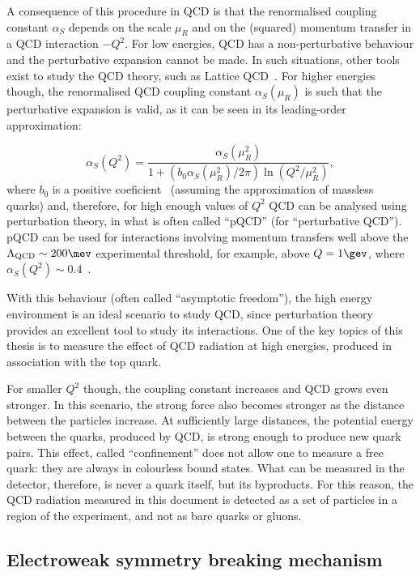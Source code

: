 A consequence of this procedure in QCD is that the
renormalised coupling constant $\alpha_S$ depends on the scale $\mu_R$ and on the (squared) momentum transfer
in a QCD interaction $- Q^2$. For low energies, QCD has a non-perturbative behaviour
and the perturbative expansion cannot be made. In such situations, other tools exist to study the QCD theory, such as Lattice QCD~\cite{latticeqcd}.
For higher energies though, the renormalised QCD coupling constant $\alpha_S(\mu_R)$ is such that the perturbative expansion is valid, as it can be
seen in its leading-order approximation:

\begin{equation}
\alpha_S(Q^2) = \frac{\alpha_S(\mu_R^2)}{1 + (b_0 \alpha_S(\mu_R^2)/2\pi) \ln(Q^2/\mu_R^2)},
\label{eq:alphas}
\end{equation}
where $b_0$ is a positive coeficient~\cite{qft} (assuming the approximation of massless quarks) and, therefore, for high enough values of $Q^2$ QCD can be
analysed using perturbation theory, in what is often called ``pQCD'' (for ``perturbative QCD''). pQCD can be used for interactions involving momentum transfers well
above the $\Lambda_{\textrm{QCD}} \sim 200\mev$ experimental threshold, for example, above $Q = 1\gev$, where $\alpha_S(Q^2) \sim 0.4$~\cite{qft}.

With this behaviour (often called ``asymptotic freedom''), the high energy environment is an ideal scenario to study QCD, since perturbation theory
provides an excellent tool to study its interactions. One of the key topics of this thesis is to
measure the effect of QCD radiation at high energies, produced in association with
the top quark.

For smaller $Q^2$ though, the coupling constant increases and QCD grows even stronger. In this scenario, the strong force also becomes stronger as the distance between the
particles increase. At sufficiently large distances, the potential energy between the quarks, produced by QCD, is strong enough to produce new quark pairs. This effect, called
``confinement'' does not allow one to measure a free quark: they are always in colourless bound states. What can be measured in the detector, therefore, is never a quark itself,
but its byproducts. For this reason, the QCD radiation measured in this document is detected as a set of particles in a region of the experiment, and not as bare quarks
or gluons.

\subsection{Electroweak symmetry breaking mechanism}
\label{subsec:higgs}

